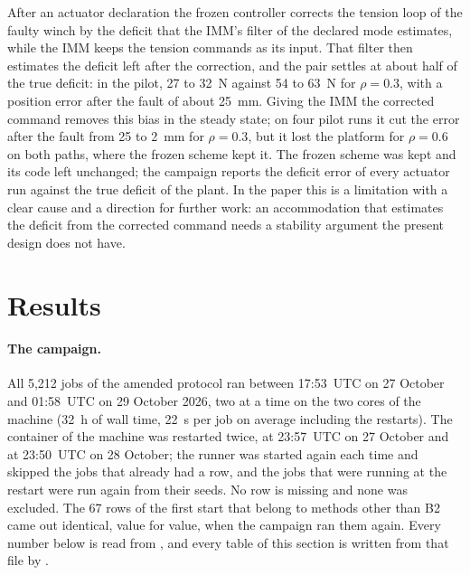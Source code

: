 \documentclass[10pt]{article}
\begin{document}
After an actuator declaration the frozen controller corrects the tension loop of the faulty winch by the deficit that the IMM's filter of the declared mode estimates, while the IMM keeps the tension commands as its input. That filter then estimates the deficit left after the correction, and the pair settles at about half of the true deficit: in the pilot, 27 to 32~N against 54 to 63~N for $\rho=0.3$, with a position error after the fault of about 25~mm. Giving the IMM the corrected command removes this bias in the steady state; on four pilot runs it cut the error after the fault from 25 to 2~mm for $\rho=0.3$, but it lost the platform for $\rho=0.6$ on both paths, where the frozen scheme kept it. The frozen scheme was kept and its code left unchanged; the campaign reports the deficit error of every actuator run against the true deficit of the plant. In the paper this is a limitation with a clear cause and a direction for further work: an accommodation that estimates the deficit from the corrected command needs a stability argument the present design does not have.

\section{Results}\label{sec:results}

\paragraph{The campaign.} All 5,212 jobs of the amended protocol ran between 17:53~UTC on 27 October and 01:58~UTC on 29 October 2026, two at a time on the two cores of the machine (32~h of wall time, 22~s per job on average including the restarts). The container of the machine was restarted twice, at 23:57~UTC on 27 October and at 23:50~UTC on 28 October; the runner was started again each time and skipped the jobs that already had a row, and the jobs that were running at the restart were run again from their seeds. No row is missing and none was excluded. The 67 rows of the first start that belong to methods other than B2 came out identical, value for value, when the campaign ran them again. Every number below is read from , and every table of this section is written from that file by .


\end{document}
